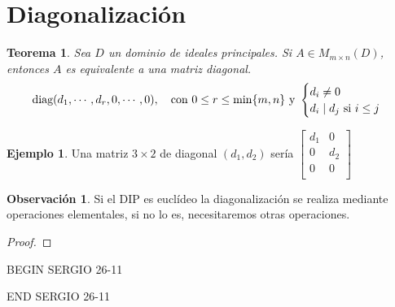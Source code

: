 \documentclass{article}
\theoremstyle{theorem-style}  %
\newtheorem{theorem}{Teorema}[section]  %
\theoremstyle{definition}
\newtheorem*{observation}{Observación} %
\theoremstyle{example-style}
\newtheorem{example}{Ejemplo}[section]
\begin{document}
	\section{Diagonalización}
	\begin{theorem}
		Sea $ D $ un dominio de ideales principales. Si $ A \in M_{m\times n}(D) $, entonces $ A $ es equivalente a una matriz diagonal.
		\[ \text{diag}(d_1, \cdots, d_r, 0, \cdots, 0), \quad \text{con } 0\leq r \leq \min \{m,n\} \text{ y }\begin{cases}
			d_i\neq 0\\
			d_i \mid d_j $ si $ i\leq j
		\end{cases}\]
		
		
	\end{theorem}
	\begin{example}
		Una matriz $3\times 2$ de diagonal $(d_1,d_2)$ sería $\begin{bmatrix}
		d_1 & 0  \\
		0   & d_2\\
		0   & 0  \\
		\end{bmatrix}$
	\end{example}
	\begin{observation}
		Si el DIP es euclídeo la diagonalización se realiza mediante operaciones elementales, si no lo es, necesitaremos otras operaciones.
	\end{observation}
	\begin{proof}
		
	\end{proof}

BEGIN SERGIO 26-11


END SERGIO 26-11
\end{document}

